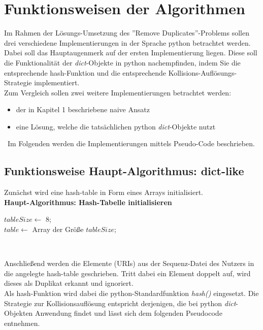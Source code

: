 \documentclass[
10pt, %
a4paper, %
oneside, %
headinclude,footinclude, %
BCOR5mm, %
]{scrartcl}
\begin{document}
\section{Funktionsweisen der Algorithmen}
Im Rahmen der Lösungs-Umsetzung des ''Remove Duplicates''-Problems sollen drei verschiedene Implementierungen in der Sprache python betrachtet werden.\\
Dabei soll das Hauptaugenmerk auf der ersten Implementierung liegen. Diese soll die Funktionalität der \textit{dict}-Objekte in python nachempfinden, indem Sie die entsprechende hash-Funktion und die entsprechende Kollisions-Auflösungs-Strategie implementiert.\\
Zum Vergleich sollen zwei weitere Implementierungen betrachtet werden:\\
\begin{itemize}[noitemsep]
	\item der in Kapitel 1 beschriebene naive Ansatz 
	\item eine Lösung, welche die tatsächlichen python \textit{dict}-Objekte nutzt
\end{itemize}\
Im Folgenden werden die Implementierungen mittels Pseudo-Code beschrieben.

\subsection{Funktionsweise Haupt-Algorithmus: dict-like}

Zunächst wird eine hash-table in Form eines Arrays initialisiert.\\

\textbf{Haupt-Algorithmus: Hash-Tabelle initialisieren}\\
 \begin{algorithm}[H]
	$tableSize \leftarrow$ 8;\\
	$table \leftarrow$ Array der Größe $tableSize$;\\
	
\end{algorithm}\

Anschließend werden die Elemente (URIs) aus der Sequenz-Datei des Nutzers in die angelegte hash-table geschrieben. Tritt dabei ein Element doppelt auf, wird dieses als Duplikat erkannt und ignoriert.\\
Als hash-Funktion wird dabei die python-Standardfunktion \textit{hash()} eingesetzt. Die Strategie zur Kollisionsauflösung entspricht derjenigen, die bei python \textit{dict}-Objekten Anwendung findet und lässt sich dem folgenden Pseudocode entnehmen.
\end{document}
